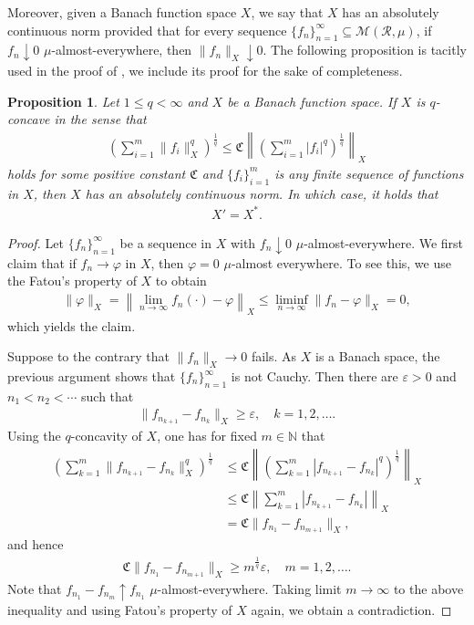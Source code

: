 \documentclass[10pt,reqno]{amsart}
\newtheorem{proposition}[theorem]{Proposition}
\numberwithin{equation}{section}
\begin{document}
Moreover, given a Banach function space $X$, we say that $X$ has an absolutely continuous norm provided that for every sequence $\{f_{n}\}_{n=1}^{\infty}\subseteq\mathcal{M}(\mathcal{R},\mu)$, if $f_{n}\downarrow 0$ $\mu$-almost-everywhere, then $\|f_{n}\|_{X}\downarrow 0$. The following proposition is tacitly used in the proof of \cite[Proposition 2.8]{OP}, we include its proof for the sake of completeness.
\begin{proposition}\label{use convex}
Let $1\leq q<\infty$ and $X$ be a Banach function space. If $X$ is $q$-concave in the sense that
\begin{align*}
\left(\sum_{i=1}^{m}\|f_{i}\|_{X}^{q}\right)^{\frac{1}{q}}\leq\mathfrak{C}\left\|\left(\sum_{i=1}^{m}|f_{i}|^{q}\right)^{\frac{1}{q}}\right\|_{X}
\end{align*}
holds for some positive constant $\mathfrak{C}$ and $\{f_{i}\}_{i=1}^{m}$ is any finite sequence of functions in $X$, then $X$ has an absolutely continuous norm. In which case, it holds that
\begin{align*}
X'=X^{\ast}.
\end{align*}
\end{proposition}

\begin{proof}
Let $\{f_{n}\}_{n=1}^{\infty}$ be a sequence in $X$ with $f_{n}\downarrow 0$ $\mu$-almost-everywhere. We first claim that if $f_{n}\rightarrow\varphi$ in $X$, then $\varphi=0$ $\mu$-almost everywhere. To see this, we use the Fatou's property of $X$ to obtain
\begin{align*}
\|\varphi\|_{X}=\left\|\lim_{n\rightarrow\infty}f_{n}(\cdot)-\varphi\right\|_{X}\leq\liminf_{n\rightarrow\infty}\|f_{n}-\varphi\|_{X}=0,
\end{align*}
which yields the claim.

Suppose to the contrary that $\|f_{n}\|_{X}\rightarrow 0$ fails. As $X$ is a Banach space, the previous argument shows that $\{f_{n}\}_{n=1}^{\infty}$ is not Cauchy. Then there are $\varepsilon>0$ and $n_{1}<n_{2}<\cdots$ such that 
\begin{align*}
\|f_{n_{k+1}}-f_{n_{k}}\|_{X}\geq\varepsilon,\quad k=1,2,\ldots.
\end{align*}
Using the $q$-concavity of $X$, one has for fixed $m\in\mathbb{N}$ that
\begin{align*}
\left(\sum_{k=1}^{m}\|f_{n_{k+1}}-f_{n_{k}}\|_{X}^{q}\right)^{\frac{1}{q}}&\leq\mathfrak{C}\left\|\left(\sum_{k=1}^{m}|f_{n_{k+1}}-f_{n_{k}}|^{q}\right)^{\frac{1}{q}}\right\|_{X}\\
&\leq\mathfrak{C}\left\|\sum_{k=1}^{m}|f_{n_{k+1}}-f_{n_{k}}|\right\|_{X}\\
&=\mathfrak{C}\|f_{n_{1}}-f_{n_{m+1}}\|_{X},
\end{align*}
and hence
\begin{align*}
\mathfrak{C}\|f_{n_{1}}-f_{n_{m+1}}\|_{X}\geq m^{\frac{1}{q}}\varepsilon,\quad m=1,2,\ldots.
\end{align*}
Note that $f_{n_{1}}-f_{n_{m}}\uparrow f_{n_{1}}$ $\mu$-almost-everywhere. Taking limit $m\rightarrow\infty$ to the above inequality and using Fatou's property of $X$ again, we obtain a contradiction.
\end{proof}
\end{document}
